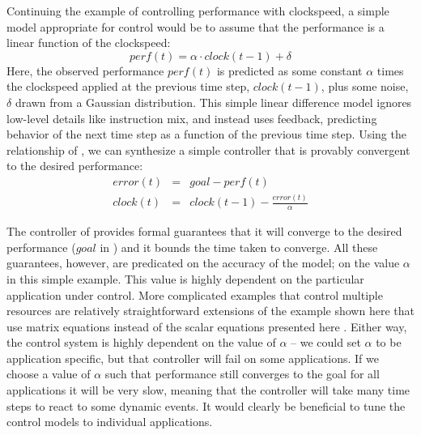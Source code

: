 Continuing the example of controlling performance with clockspeed, a
simple model appropriate for control would be to assume that the
performance is a linear function of the clockspeed:
\begin{equation}
  perf(t) = \alpha \cdot clock(t-1) + \delta \label{eqn:clock}
\end{equation}
Here, the observed performance $perf(t)$ is predicted as some constant
$\alpha$ times the clockspeed applied at the previous time step,
$clock(t-1)$, plus some noise, $\delta$ drawn from a Gaussian
distribution.  This simple linear difference model ignores low-level
details like instruction mix, and instead uses feedback, predicting
behavior of the next time step as a function of the previous time
step.  Using the relationship of , we can synthesize a
simple controller that is provably convergent to the desired
performance:
\begin{eqnarray}
  error(t) &=& goal - perf(t) \label{eqn:clock-error} \\
  clock(t) &=& clock(t-1) - \frac{error(t)}{\alpha}
  \label{eqn:clock-control}
\end{eqnarray}


The controller of  provides formal guarantees
that it will converge to the desired performance ($goal$ in
) and it bounds the time taken to converge.  All
these guarantees, however, are predicated on the accuracy of the
model; \ie on the value $\alpha$ in this simple example.  This value is
highly dependent on the particular application under control.  More
complicated examples that control multiple resources are relatively
straightforward extensions of the example shown here that use matrix
equations instead of the scalar equations presented here
\cite{METE,others}.  Either way, the control system is highly
dependent on the value of $\alpha$ -- we could set $\alpha$ to be
application specific, but that controller will fail on some
applications.  If we choose a value of $\alpha$ such that performance still
converges to the goal for all applications it will be very slow,
meaning that the controller will take many time steps to react to some
dynamic events.  It would clearly be beneficial to tune the control
models to individual applications.

